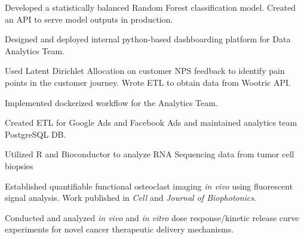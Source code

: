 \documentclass[]{snizami-resume}
\begin{document}
\begin{minipage}[t]{0.72\textwidth}
\begin{tightemize}
\item Developed a statistically balanced Random Forest classification model. Created an API to serve model outputs in production.
\item Designed and deployed internal python-based dashboarding platform for Data Analytics Team.
\item Used Latent Dirichlet Allocation on customer NPS feedback to identify pain
points in the customer journey. Wrote ETL to obtain data from Wootric API.
\item Implemented dockerized workflow for the Analytics Team.
\item Created ETL for Google Ads and Facebook Ads and maintained analytics team PostgreSQL DB.
\end{tightemize}
\sectionsep

\begin{tightemize}
\item Utilized R and Bioconductor to analyze RNA Sequencing data from tumor cell biopsies
\end{tightemize}
\sectionsep

\begin{tightemize}
\item Established quantifiable functional osteoclast imaging \textit{in vivo} using fluorescent signal analysis. Work published in \textit{Cell} and \textit{Journal of Biophotonics}.
\item Conducted and analyzed \textit{in vivo} and \textit{in vitro} dose response/kinetic release curve experiments for novel cancer therapeutic delivery mechanisms.
\end{tightemize}
\sectionsep

\end{minipage} 
\end{document}
